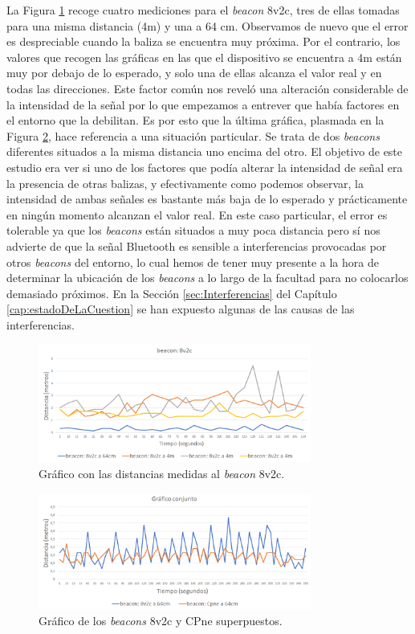 La Figura \ref{fig:dist_8v2c} recoge cuatro mediciones para el \textit{beacon} 8v2c, tres de ellas tomadas para una misma distancia (4m) y una a 64 cm. Observamos de nuevo que el error es despreciable cuando la baliza se encuentra muy próxima. Por el contrario, los valores que recogen las gráficas en las que el dispositivo se encuentra a 4m están muy por debajo de lo esperado, y solo una de ellas alcanza el valor real y en todas las direcciones. Este factor común nos reveló una alteración considerable de la intensidad de la señal por lo que empezamos a entrever que había factores en el entorno que la debilitan. Es por esto que la última gráfica, plasmada en la Figura \ref{fig:dist_conjunto}, hace referencia a una situación particular. Se trata de dos \textit{beacons} diferentes situados a la misma distancia uno encima del otro. El objetivo de este estudio era ver si uno de los factores que podía alterar la intensidad de señal era la presencia de otras balizas, y efectivamente como podemos observar, la intensidad de ambas señales es bastante más baja de lo esperado y prácticamente en ningún momento alcanzan el valor real. En este caso particular, el error es tolerable ya que los \textit{beacons} están situados a muy poca distancia pero sí nos advierte de que la señal Bluetooth es sensible a interferencias provocadas por otros \textit{beacons} del entorno, lo cual hemos de tener muy presente a la hora de determinar la ubicación de los \textit{beacons} a lo largo de la facultad para no colocarlos demasiado próximos. En la Sección \ref{sec:Interferencias} del Capítulo \ref{cap:estadoDeLaCuestion} se han expuesto algunas de las causas de las interferencias.
\begin{figure}[t]
	\centering
	\includegraphics[width=0.8\textwidth]{Imagenes/Descripciondeltrabajo/dist_8v2c}
	\caption{Gráfico con las distancias medidas al \textit{beacon} 8v2c. }
	\label{fig:dist_8v2c}
\end{figure}
\begin{figure}[t]
	\centering
	\includegraphics[width=0.8\textwidth]{Imagenes/Descripciondeltrabajo/dist_conjunto}
	\caption{Gráfico de los \textit{beacons} 8v2c y CPne superpuestos. }
	\label{fig:dist_conjunto}
\end{figure}

